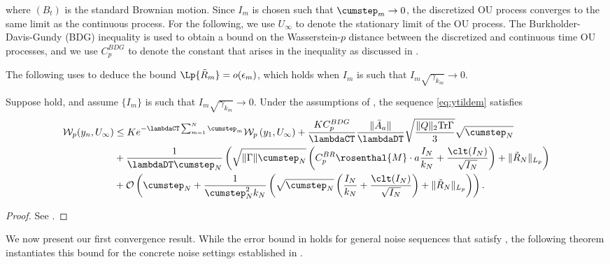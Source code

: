 \documentclass[11pt]{article}
\begin{document}
where $(B_t)$ is the standard Brownian motion. 
Since $I_m$ is chosen such that $\cumstep_m \to 0$, the discretized OU process converges to the same limit as the continuous process. 
For the following, we use $U_\infty$ to denote the stationary limit of the OU process.  
The Burkholder-Davis-Gundy (BDG) inequality \citep[Theorem 5.16]{le2016brownian} is used to obtain a bound on the Wasserstein-$p$ distance between the discretized and continuous time OU processes, and we use $C_p^{BDG}$ to denote the constant that arises in the inequality as discussed in .



The following uses  to deduce the bound $\Lp{\tilde{R}_m} = o(\epsilon_m)$, which holds when $I_m$ is such that $I_m \sqrt{\gamma_{k_m}} \to 0$.
\begin{lemma}\label{lem:Wp_recursion}
    Suppose  hold, and assume $\{I_m\}$ is such that $I_m \sqrt{\gamma_{k_m}} \to 0$. 
    Under the assumptions of , the sequence \eqref{eq:ytildem} satisfies  
    \begin{equation}\label{eq:Wp_recursion}
    \begin{split}
    \mathcal{W}_{p} (y_{n}, U_\infty)
    &\leq
    K e^{-\lambdaCT \sum_{m=1}^N \cumstep_m} \mathcal{W}_{p} \left(y_1, U_\infty \right) 
    + \frac{K C_p^{BDG}}{\lambdaCT} \frac{\lVert \bar{A}_a \rVert}{\lambdaDT} \sqrt{\frac{\lVert Q \rVert_2\mathrm{Tr} \Gamma}{3}}\sqrt{\cumstep_N}
    \\ &
    + \frac{1}{\lambdaDT \cumstep_N} \left(
    \sqrt{\lVert \Gamma \rVert \cumstep_N} \left(C_{p}^{BR} \rosenthal{M} \cdot a \frac{I_N}{k_N} +  \frac{\clt(I_N)}{\sqrt{I_N}} \right)
    + \lVert \tilde{R}_N \rVert_{L_p}
    \right)    
    \\ &
    + \mathcal{O}\left(\cumstep_N 
    +
    \frac{1}{\cumstep_N^2 k_N} \left( \sqrt{\cumstep_N} \left(\frac{I_N}{k_N} + \frac{ \clt (I_N)}{\sqrt{I_N}} \right) + \lVert \tilde{R}_N \rVert_{L_p} \right) 
    \right)
    .
    \end{split}
    \end{equation}
\end{lemma}
\begin{proof}
    See .
\end{proof}
We now present our first convergence result.
While the error bound in  holds for general noise sequences that satisfy , the following theorem instantiates this bound for the concrete noise settings established in . 
\end{document}
